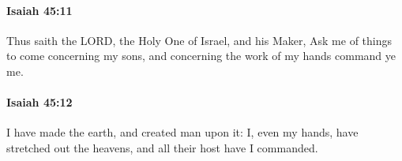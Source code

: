 		\paragraph{Isaiah 45:11} %
			\label{ISAIAH-45-11}

			Thus saith the LORD, the Holy One of Israel, and his Maker, Ask me of things to come concerning my sons, and concerning the work of my hands command ye me.


		\paragraph{Isaiah 45:12} %
			\label{ISAIAH-45-12}

			I have made the earth, and created man upon it: I, even my hands, have stretched out the heavens, and all their host have I commanded.


